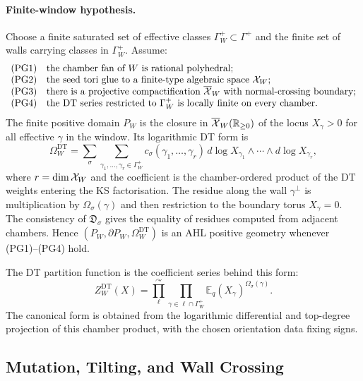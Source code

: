 \paragraph{Finite-window hypothesis.}
Choose a finite saturated set of effective classes
$\Gamma_W^+\subset \Gamma^+$ and the finite set of walls carrying
classes in $\Gamma_W^+$. Assume:
\[
\begin{array}{ll}
\mathrm{(PG1)}&
  \text{the chamber fan of } W \text{ is rational polyhedral;}\\
\mathrm{(PG2)}&
  \text{the seed tori glue to a finite-type algebraic space }
  \mathcal{X}_W;\\
\mathrm{(PG3)}&
  \text{there is a projective compactification }
  \overline{\mathcal{X}}_W \text{ with normal-crossing boundary;}\\
\mathrm{(PG4)}&
  \text{the DT series restricted to } \Gamma_W^+
  \text{ is locally finite on every chamber.}
\end{array}
\]
The finite positive domain $P_W$ is the closure in
$\overline{\mathcal{X}}_W(\mathbb{R}_{\ge0})$ of the locus
$X_\gamma>0$ for all effective $\gamma$ in the window. Its logarithmic
DT form is
\[
  \Omega_W^{\mathrm{DT}}
  =
  \sum_{\sigma}
  \sum_{\gamma_1,\ldots,\gamma_r\in\Gamma_W^+}
  c_\sigma(\gamma_1,\ldots,\gamma_r)\,
  d\log X_{\gamma_1}\wedge\cdots\wedge d\log X_{\gamma_r},
\]
where $r=\dim \mathcal{X}_W$ and the coefficient is the chamber-ordered product
of the DT weights entering the KS factorisation. The residue along the
wall $\gamma^\perp$ is multiplication by $\Omega_\sigma(\gamma)$ and
then restriction to the boundary torus $X_\gamma=0$. The consistency of
$\mathfrak D_\sigma$ gives the equality of residues computed from
adjacent chambers. Hence $(P_W,\partial P_W,\Omega_W^{\mathrm{DT}})$ is
an AHL positive geometry whenever (PG1)--(PG4) hold.

The DT partition function is the coefficient series behind this form:
\[
  Z_W^{\mathrm{DT}}(X)
  =
  \prod_{\ell}^{\curvearrowright}
  \prod_{\gamma\in \ell\cap\Gamma_W^+}
  \mathbb E_q(X_\gamma)^{\Omega_\sigma(\gamma)}.
\]
The canonical form is obtained from the logarithmic differential and
top-degree projection of this chamber product, with the chosen
orientation data fixing signs.

\subsection*{Mutation, Tilting, and Wall Crossing}
\label{sec:mutation-tilting-wall-crossing}

